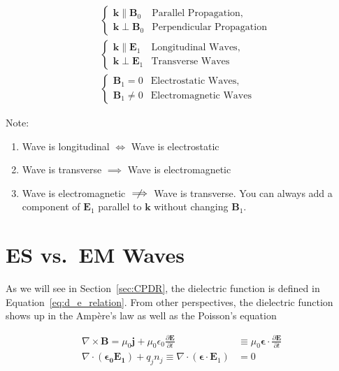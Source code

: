 \documentclass[
  notoc %
]{tufte-book}
\providecommand{\tightlist}{%
  \setlength{\itemsep}{0pt}\setlength{\parskip}{0pt}
}
\begin{document}
\[
\begin{aligned}
&\left\{
\begin{array}{ll}
\mathbf{k}\parallel \mathbf{B}_0 & \text{Parallel Propagation}, \\
\mathbf{k}\perp\mathbf{B}_0 & \text{Perpendicular Propagation}
\end{array} \right. \\
&\left\{
\begin{array}{ll}
\mathbf{k}\parallel \mathbf{E}_1 & \text{Longitudinal Waves}, \\
\mathbf{k}\perp\mathbf{E}_1 & \text{Transverse Waves}
\end{array} \right. \\
&\left\{
\begin{array}{ll}
\mathbf{B}_1 = 0 & \text{Electrostatic Waves}, \\
\mathbf{B}_1 \neq 0 & \text{Electromagnetic Waves}
\end{array} \right.
\end{aligned}
\]

Note:

\begin{enumerate}
\def\labelenumi{\arabic{enumi}.}
\tightlist
\item
  Wave is longitudinal \(\Longleftrightarrow\) Wave is electrostatic
\item
  Wave is transverse \(\implies\) Wave is electromagnetic
\item
  Wave is electromagnetic \(\centernot\implies\) Wave is transverse. You
  can always add a component of \(\mathbf{E}_1\) parallel to
  \(\mathbf{k}\) without changing \(\mathbf{B}_1\).
\end{enumerate}

\hypertarget{es-vs.-em-waves}{%
\section{ES vs.~EM Waves}\label{es-vs.-em-waves}}

As we will see in Section~\ref{sec:CPDR}, the dielectric function is
defined in Equation~\ref{eq:d_e_relation}. From other perspectives, the
dielectric function shows up in the Ampère's law as well as the
Poisson's equation

\[
\begin{aligned}
\nabla\times\mathbf{B}=\mu_0\mathbf{j}+\mu_0\epsilon_0\frac{\partial\mathbf{E}}{\partial t}&\equiv\mu_0\pmb{\epsilon}\cdot\frac{\partial \mathbf{E}}{\partial t} \\
\nabla\cdot(\mathbf{\epsilon_0 \mathbf{E}_1}) + q_j n_j \equiv\nabla\cdot(\pmb{\epsilon}\cdot\mathbf{E}_1) &= 0
\end{aligned}
\]
\end{document}
